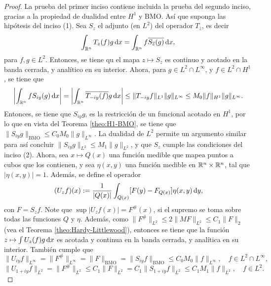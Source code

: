 \begin{proof}
	La prueba del primer inciso contiene incluida la prueba del segundo inciso, gracias a la propiedad de dualidad entre $H^1$ y $\mathrm{BMO}$. Así que suponga las hipótesis del inciso (1). Sea $S_z$ el adjunto (en $L^2$) del operador $T_{\overline{z}}$, es decir
	\begin{equation*}
		\int_{\mathbb{R}^n} T_z(f)g \mathop{}\!\mathrm{d} x = \int_{\mathbb{R}^n} f \overline{S_{\overline{z}}(g)} \mathop{}\!\mathrm{d} x,
	\end{equation*}
	para $f,g\in L^2$. Entonces, se tiene qu el mapa $z\mapsto S_z$ es continuo y acotado en la banda cerrada, y analítico en su interior. Ahora, para $g\in L^2\cap L^\infty$, y $f \in L^2\cap H^1$, se tiene que 
	\begin{equation*}
		\left| \int_{\mathbb{R}^n} f S_{iy}(g) \mathop{}\!\mathrm{d} x 
		\right| = 	\left| \int_{\mathbb{R}^n} \overline{T_{-iy}(f)} g \mathop{}\!\mathrm{d} x 
		\right| \leq \|T_{-iy}f\|_{L^1}\|g\|_{L^\infty} \leq M_0 \|f\|_{H^1}\|g\|_{L^\infty}.
	\end{equation*}
	Entonces, se tiene que $S_{iy}g$, es la restricción de un funcional acotado en $H^1$, por lo que en vista del Teorema \ref{theo:H1-BMO}, se tiene que $\|S_{iy}g\|_{\mathrm{BMO}}  \leq  C_0M_0\|g\|_{L^\infty}$. La dualidad de $L^2$ permite un argumento similar para así concluir $\|S_{iy}g\|_{L^2}  \leq  M_1\|g\|_{L^2}$, y que $S_z$ cumple las condiciones del inciso (2). Ahora, sea $x\mapsto Q(x)$ una función medible que mapea puntos a cubos que los contienen, y sea $\eta(x, y)$ una función medible en $\mathbb{R}^n\times\mathbb{R}^n$, tal que  $|\eta(x, y)|=1$. Además, se define el operador 
	\begin{equation*}
		(U_zf)(x) := \frac{1}{|Q(x)|} \int_{Q(x)} [F(y) - F_{Q(x)}]\eta(x, y) \mathop{}\!\mathrm{d} y, 
	\end{equation*}
	con $F=S_zf$. Note que $\sup|U_zf(x)| = F^\#(x)$, si el supremo se toma sobre todas las funciones $Q$ y $\eta$. Además, como $\|F^\#\|_{L^2} \leq 2\|MF\|_{L^2} \leq C_1\|F\|_2$ (vea el Teorema \ref{theo:Hardy-Littlewood}), entonces se tiene que la función $z\mapsto \int U_z(f)g\mathop{}\!\mathrm{d} x$ es acotada y continua en la banda cerrada, y analítica en su interior. También cumple que 
	\begin{equation*}
		\|U_{iy} f\|_{L^\infty} = \|F^\#\|_{L^\infty} = \|F\|_{\mathrm{BMO}} = \|S_{iy}f\|_{\mathrm{BMO}}  \leq C_0M_0 \|f\|_{L^\infty}, \quad f\in L^2\cap L^\infty,
	\end{equation*}
	\begin{equation*}
		\|U_{1+iy} f\|_{L^2} = \|F^\#\|_{L^2} \leq C_1\|F\|_{L^2}= C_1\|S_{1+iy}f\|_{L^2} \leq C_1M_1 \|f\|_{L^2}, \quad f\in L^2.

\end{equation*}
\end{proof}
